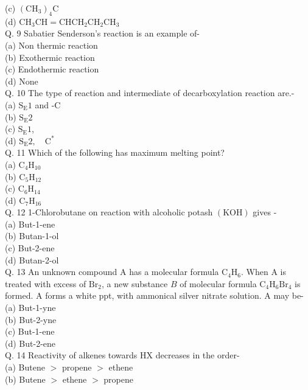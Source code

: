 \documentclass[10pt]{article}
\begin{document}
(c) $\left(\mathrm{CH}_{3}\right)_{4} \mathrm{C}$\\
(d) $\mathrm{CH}_{3} \mathrm{CH}=\mathrm{CHCH}_{2} \mathrm{CH}_{2} \mathrm{CH}_{3}$\\
Q. 9 Sabatier Senderson's reaction is an example of-\\
(a) Non thermic reaction\\
(b) Exothermic reaction\\
(c) Endothermic reaction\\
(d) None\\
Q. 10 The type of reaction and intermediate of decarboxylation reaction are.-\\
(a) $\mathrm{S}_{\mathrm{E}} 1$ and -C\\
(b) $\mathrm{S}_{\mathrm{E}} 2$\\
(c) $\mathrm{S}_{\mathrm{E}} 1$,\\
(d) $\mathrm{S}_{\mathrm{E}} 2, \quad \mathrm{C}^{*}$\\
Q. 11 Which of the following has maximum melting point?\\
(a) $\mathrm{C}_{4} \mathrm{H}_{10}$\\
(b) $\mathrm{C}_{5} \mathrm{H}_{12}$\\
(c) $\mathrm{C}_{6} \mathrm{H}_{14}$\\
(d) $\mathrm{C}_{7} \mathrm{H}_{16}$\\
Q. 12 1-Chlorobutane on reaction with alcoholic potash $(\mathrm{KOH})$ gives -\\
(a) But-1-ene\\
(b) Butan-1-ol\\
(c) But-2-ene\\
(d) Butan-2-ol\\
Q. 13 An unknown compound A has a molecular formula $\mathrm{C}_{4} \mathrm{H}_{6}$. When A is treated with excess of $\mathrm{Br}_{2}$, a new substance $B$ of molecular formula $\mathrm{C}_{4} \mathrm{H}_{6} \mathrm{Br}_{4}$ is formed. A forms a white ppt, with ammonical silver nitrate solution. A may be-\\
(a) But-1-yne\\
(b) But-2-yne\\
(c) But-1-ene\\
(d) But-2-ene\\
Q. 14 Reactivity of alkenes towards HX decreases in the order-\\
(a) Butene $>$ propene $>$ ethene\\
(b) Butene $>$ ethene $>$ propene\\
\end{document}
